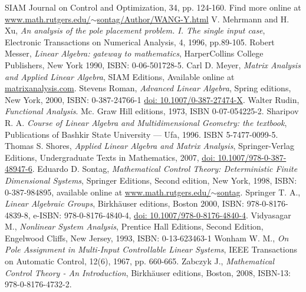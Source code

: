 \documentclass[a4paper,10pt,oneside]{book}
\begin{document}
\begin{thebibliography}{8}
      	SIAM Journal on Control and Optimization, 34, pp. 124-160. Find more online at
	\href{http://www.math.rutgers.edu/~sontag/Author/WANG-Y.html}{www.math.rutgers.edu/$\sim$sontag/Author/WANG-Y.html}
      V. Mehrmann and H. Xu,
      \emph{An analysis of the pole placement problem. I. The single input case},
      Electronic Transactions on Numerical Analysis,
      4, 1996, pp.89-105.
      Robert Messer,
      \emph{Linear Algebra: gateway to mathematics},
      HarperCollins College Publishers, New York 1990, ISBN: 0-06-501728-5.
      Carl D. Meyer, 
      \emph{Matrix Analysis and Applied Linear Algebra}, 
      SIAM Editions, Available online at \href{http://matrixanalysis.com/DownloadChapters.html}{matrixanalysis.com}.
     Stevens Roman,
     \emph{Advanced Linear Algebra},
     Spring editions, New York, 2000, ISBN: 0-387-24766-1 \href{http://www.springerlink.com/content/978-0-387-24766-3}{doi: 10.1007/0-387-27474-X}.
     Walter Rudin,
     \emph{Functional Analysis}.
     Mc. Graw Hill editions, 1973, ISBN 0-07-054225-2.
      Sharipov R. A. \emph{Course of Linear Algebra and Multidimensional Geometry: the textbook},
      Publications of Bashkir State University — Ufa, 1996.
      ISBN 5-7477-0099-5.
     Thomas S. Shores, 
     \emph{Applied Linear Algebra and Matrix Analysis},
     Springer-Verlag Editions, Undergraduate Texts in Mathematics, 2007, 
     \href{http://www.springerlink.com/content/978-0-387-33194-2/#section=271932&page=1}{doi: 10.1007/978-0-387-48947-6}.
  Eduardo D. Sontag,
      \emph{Mathematical Control Theory: Deterministic Finite Dimensional Systems},
      Springer Editions, Second edition, New York, 1998, ISBN: 0-387-984895, available online at \href{http://www.math.rutgers.edu/~sontag/}{www.math.rutgers.edu/$\sim$sontag}.
      Springer T. A., 
      \emph{Linear Algebraic Groups},
      Birkh\"{a}user editions, Boston 2000, ISBN: 978-0-8176-4839-8, e-ISBN: 978-0-8176-4840-4, \href{http://www.springerlink.com/content/978-0-8176-4839-8/}{doi: 10.1007/978-0-8176-4840-4}.
      Vidyasagar M.,
      \emph{Nonlinear System Analysis},
      Prentice Hall Editions, Second Edition, Engelwood Cliffs, New Jersey, 1993,
      ISBN: 0-13-623463-1
      Wonham W. M.,
      \emph{On Pole Assignment in Multi-Input Controllable Linear Systems},
      IEEE Transactions on Automatic Control, 12(6), 1967, pp. 660-665.
      Zabczyk J.,
      \emph{Mathematical Control Theory - An Introduction},
      Birkh\"{a}user editions, Boston, 2008, ISBN-13: 978-0-8176-4732-2.
\end{thebibliography}
\end{document}
